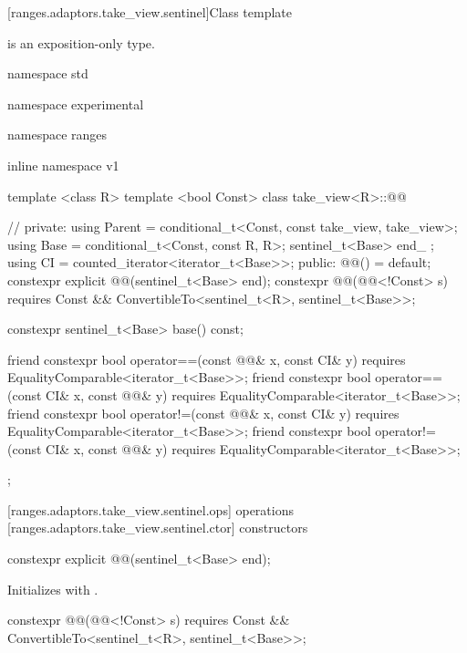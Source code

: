 [ranges.adaptors.take_view.sentinel]{Class template }

\pnum
{} is an exposition-only type.

\begin{codeblock}
namespace std { namespace experimental { namespace ranges { inline namespace v1 {
  template <class R>
  template <bool Const>
  class take_view<R>::@@ { // \expos
  private:
    using Parent = conditional_t<Const, const take_view, take_view>;
    using Base = conditional_t<Const, const R, R>;
    sentinel_t<Base> end_ {};
    using CI = counted_iterator<iterator_t<Base>>;
  public:
    @@() = default;
    constexpr explicit @@(sentinel_t<Base> end);
    constexpr @@(@@<!Const> s)
      requires Const && ConvertibleTo<sentinel_t<R>, sentinel_t<Base>>;

    constexpr sentinel_t<Base> base() const;

    friend constexpr bool operator==(const @@& x, const CI& y)
      requires EqualityComparable<iterator_t<Base>>;
    friend constexpr bool operator==(const CI& x, const @@& y)
      requires EqualityComparable<iterator_t<Base>>;
    friend constexpr bool operator!=(const @@& x, const CI& y)
      requires EqualityComparable<iterator_t<Base>>;
    friend constexpr bool operator!=(const CI& x, const @@& y)
      requires EqualityComparable<iterator_t<Base>>;
  };
}}}}
\end{codeblock}

[ranges.adaptors.take_view.sentinel.ops]{ operations}
[ranges.adaptors.take_view.sentinel.ctor]{ constructors}

\begin{itemdecl}
constexpr explicit @@(sentinel_t<Base> end);
\end{itemdecl}

\begin{itemdescr}
\pnum
\effects Initializes  with .
\end{itemdescr}

%
\begin{itemdecl}
constexpr @@(@@<!Const> s)
requires Const && ConvertibleTo<sentinel_t<R>, sentinel_t<Base>>;
\end{itemdecl}

